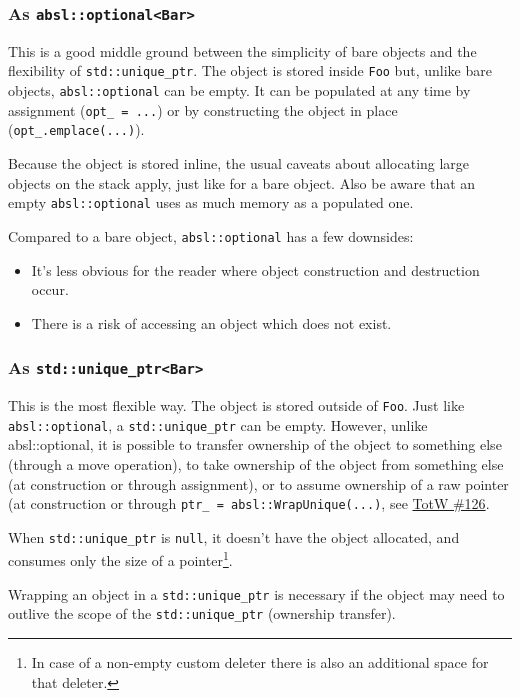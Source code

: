 \subsubsection{As \texorpdfstring{\texttt{absl::optional<Bar>}}{}}
This is a good middle ground between the simplicity of bare objects and the flexibility of \texttt{std::unique_ptr}. The object is stored inside \texttt{Foo} but, unlike bare objects, \texttt{absl::optional} can be empty. It can be populated at any time by assignment (\texttt{opt_ = ...}) or by constructing the object in place (\texttt{opt_.emplace(...)}).

Because the object is stored inline, the usual caveats about allocating large objects on the stack apply, just like for a bare object. Also be aware that an empty \texttt{absl::optional} uses as much memory as a populated one.

Compared to a bare object, \texttt{absl::optional} has a few downsides:
\begin{itemize}
    \item It’s less obvious for the reader where object construction and destruction occur.
    \item There is a risk of accessing an object which does not exist.
\end{itemize}

\subsubsection{As \texorpdfstring{\texttt{std::unique_ptr<Bar>}}{}}
This is the most flexible way. The object is stored outside of \texttt{Foo}. Just like \texttt{absl::optional}, a \texttt{std::unique_ptr} can be empty. However, unlike absl::optional, it is possible to transfer ownership of the object to something else (through a move operation), to take ownership of the object from something else (at construction or through assignment), or to assume ownership of a raw pointer (at construction or through \texttt{ptr_ = absl::WrapUnique(...)}, see \hyperref[ch:tip-of-the-week-126]{TotW \#126}.

When \texttt{std::unique_ptr} is \texttt{null}, it doesn’t have the object allocated, and consumes only the size of a pointer\footnote{In case of a non-empty custom deleter there is also an additional space for that deleter. }.

Wrapping an object in a \texttt{std::unique_ptr} is necessary if the object may need to outlive the scope of the \texttt{std::unique_ptr} (ownership transfer).

